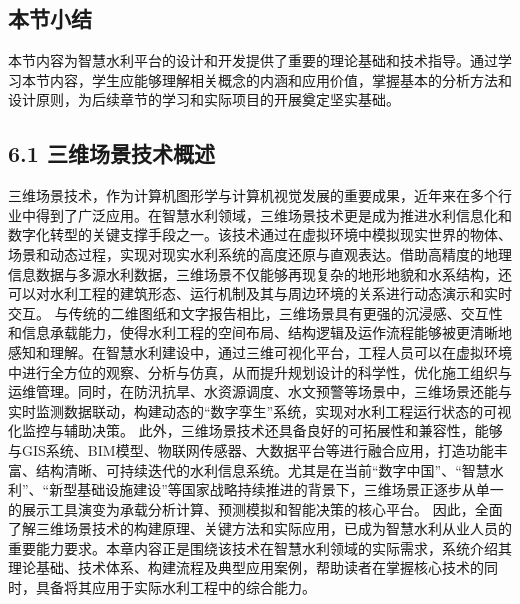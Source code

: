 {{\subsection{本节小结}\label{ux672cux8282ux5c0fux7ed3}
本节内容为智慧水利平台的设计和开发提供了重要的理论基础和技术指导。通过学习本节内容，学生应能够理解相关概念的内涵和应用价值，掌握基本的分析方法和设计原则，为后续章节的学习和实际项目的开展奠定坚实基础。 \subsection{6.1
三维场景技术概述}\label{ux4e09ux7ef4ux573aux666fux6280ux672fux6982ux8ff0}
三维场景技术，作为计算机图形学与计算机视觉发展的重要成果，近年来在多个行业中得到了广泛应用。在智慧水利领域，三维场景技术更是成为推进水利信息化和数字化转型的关键支撑手段之一。该技术通过在虚拟环境中模拟现实世界的物体、场景和动态过程，实现对现实水利系统的高度还原与直观表达。借助高精度的地理信息数据与多源水利数据，三维场景不仅能够再现复杂的地形地貌和水系结构，还可以对水利工程的建筑形态、运行机制及其与周边环境的关系进行动态演示和实时交互。
与传统的二维图纸和文字报告相比，三维场景具有更强的沉浸感、交互性和信息承载能力，使得水利工程的空间布局、结构逻辑及运作流程能够被更清晰地感知和理解。在智慧水利建设中，通过三维可视化平台，工程人员可以在虚拟环境中进行全方位的观察、分析与仿真，从而提升规划设计的科学性，优化施工组织与运维管理。同时，在防汛抗旱、水资源调度、水文预警等场景中，三维场景还能与实时监测数据联动，构建动态的``数字孪生''系统，实现对水利工程运行状态的可视化监控与辅助决策。
此外，三维场景技术还具备良好的可拓展性和兼容性，能够与GIS系统、BIM模型、物联网传感器、大数据平台等进行融合应用，打造功能丰富、结构清晰、可持续迭代的水利信息系统。尤其是在当前``数字中国''、``智慧水利''、``新型基础设施建设''等国家战略持续推进的背景下，三维场景正逐步从单一的展示工具演变为承载分析计算、预测模拟和智能决策的核心平台。
因此，全面了解三维场景技术的构建原理、关键方法和实际应用，已成为智慧水利从业人员的重要能力要求。本章内容正是围绕该技术在智慧水利领域的实际需求，系统介绍其理论基础、技术体系、构建流程及典型应用案例，帮助读者在掌握核心技术的同时，具备将其应用于实际水利工程中的综合能力。
}}
